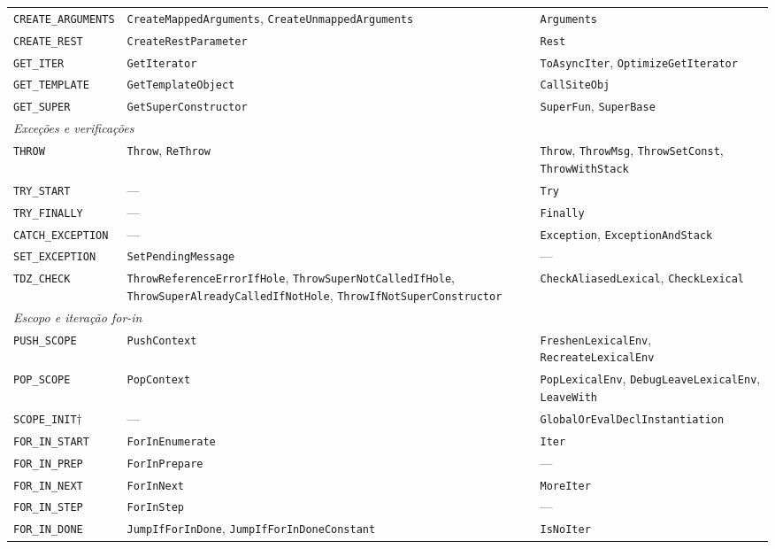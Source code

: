 {\begin{longtable}{@{}p{4.2cm}p{5.3cm}p{5.3cm}@{}}
\texttt{CREATE\_ARGUMENTS} & \texttt{CreateMappedArguments}, \texttt{CreateUnmappedArguments} & \texttt{Arguments} \\
\texttt{CREATE\_REST} & \texttt{CreateRestParameter} & \texttt{Rest} \\
\texttt{GET\_ITER} & \texttt{GetIterator} & \texttt{ToAsyncIter}, \texttt{OptimizeGetIterator} \\
\texttt{GET\_TEMPLATE} & \texttt{GetTemplateObject} & \texttt{CallSiteObj} \\
\texttt{GET\_SUPER} & \texttt{GetSuperConstructor} & \texttt{SuperFun}, \texttt{SuperBase} \\
\midrule
\multicolumn{3}{l}{\textit{Exceções e verificações}} \\
\midrule
\texttt{THROW} & \texttt{Throw}, \texttt{ReThrow} & \texttt{Throw}, \texttt{ThrowMsg}, \texttt{ThrowSetConst}, \texttt{ThrowWithStack} \\
\texttt{TRY\_START} & --- & \texttt{Try} \\
\texttt{TRY\_FINALLY} & --- & \texttt{Finally} \\
\texttt{CATCH\_EXCEPTION} & --- & \texttt{Exception}, \texttt{ExceptionAndStack} \\
\texttt{SET\_EXCEPTION} & \texttt{SetPendingMessage} & --- \\
\texttt{TDZ\_CHECK} & \texttt{ThrowReferenceErrorIfHole}, \texttt{ThrowSuperNotCalledIfHole}, \texttt{ThrowSuperAlreadyCalledIfNotHole}, \texttt{ThrowIfNotSuperConstructor} & \texttt{CheckAliasedLexical}, \texttt{CheckLexical} \\
\midrule
\multicolumn{3}{l}{\textit{Escopo e iteração for-in}} \\
\midrule
\texttt{PUSH\_SCOPE} & \texttt{PushContext} & \texttt{FreshenLexicalEnv}, \texttt{RecreateLexicalEnv} \\
\texttt{POP\_SCOPE} & \texttt{PopContext} & \texttt{PopLexicalEnv}, \texttt{DebugLeaveLexicalEnv}, \texttt{LeaveWith} \\
\texttt{SCOPE\_INIT}$\dagger$ & --- & \texttt{GlobalOrEvalDeclInstantiation} \\
\texttt{FOR\_IN\_START} & \texttt{ForInEnumerate} & \texttt{Iter} \\
\texttt{FOR\_IN\_PREP} & \texttt{ForInPrepare} & --- \\
\texttt{FOR\_IN\_NEXT} & \texttt{ForInNext} & \texttt{MoreIter} \\
\texttt{FOR\_IN\_STEP} & \texttt{ForInStep} & --- \\
\texttt{FOR\_IN\_DONE} & \texttt{JumpIfForInDone}, \texttt{JumpIfForInDoneConstant} & \texttt{IsNoIter} \\

\end{longtable}}
